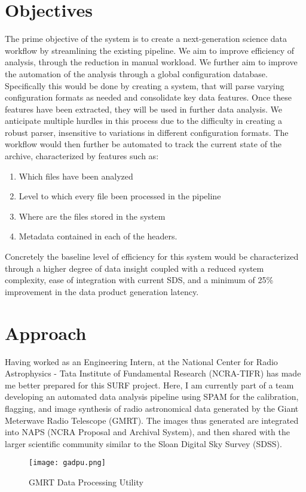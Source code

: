 \documentclass{article}
\begin{document}
\begin{multicols*}{2}
\section{Objectives}
The prime objective of the system is to create a next-generation science data workflow by streamlining the existing pipeline.
We aim to improve efficiency of analysis, through the reduction in manual workload. We further aim to improve the automation of the analysis through a global configuration database.
Specifically this would be done by creating a system, that will parse varying configuration formats as needed and consolidate key data features. Once these features have been extracted, they will be used in further data analysis. We anticipate multiple hurdles in this process due to the difficulty in creating a robust parser, insensitive to variations in different configuration formats. 
The workflow would then further be automated to track the current state of the archive, characterized by features such as:
\begin{enumerate}
\itemsep0em 
\item Which files have been analyzed
\item Level to which every file been processed in the pipeline
\item Where are the files stored in the system
\item Metadata contained in each of the headers.
\end{enumerate}

Concretely the baseline level of efficiency for this system would be characterized through a higher degree of data insight coupled with a reduced system complexity, ease of integration with current SDS, and a minimum of 25\% improvement in the data product generation latency.

\section{Approach}
Having worked as an Engineering Intern, at the National Center for Radio Astrophysics - Tata Institute of Fundamental Research (NCRA-TIFR) has made me better prepared for this SURF project. Here, I am currently part of a team developing an automated data analysis pipeline using SPAM \cite{spam-intema} for the calibration, flagging, and image synthesis of radio astronomical data generated by the Giant Meterwave Radio Telescope (GMRT). The images thus generated are integrated into NAPS (NCRA Proposal and Archival System), and then shared with the larger scientific community similar to the Sloan Digital Sky Survey (SDSS).
\begin{figure}[H]
\centering
\texttt{[image: gadpu.png]}
\caption{GMRT Data Processing Utility}
\end{figure}


\end{multicols*}
\end{document}
